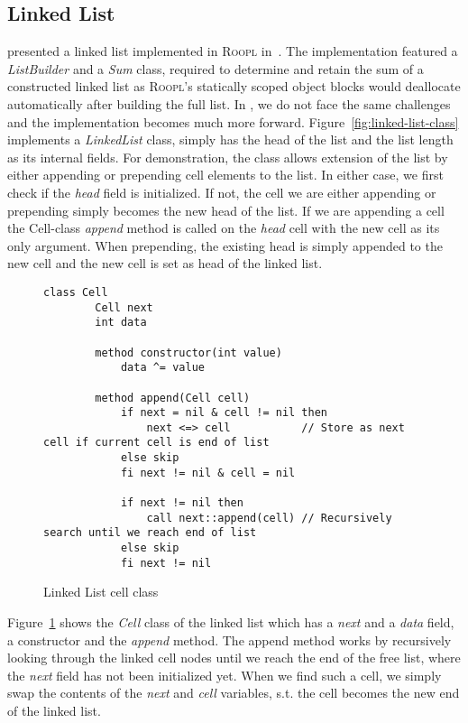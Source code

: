 \subsection{Linked List}
\label{subsec:linked-list}
\citeauthor{th:roopl} presented a linked list implemented in \textsc{Roopl} in~\cite{th:roopl}. The implementation featured a \textit{ListBuilder} and a \textit{Sum} class, required to determine and retain the sum of a constructed linked list as \textsc{Roopl}'s statically scoped object blocks would deallocate automatically after building the full list. In \rooplpp, we do not face the same challenges and the implementation becomes much more forward. Figure~\ref{fig:linked-list-class} implements a \textit{LinkedList} class, simply has the head of the list and the list length as its internal fields. For demonstration, the class allows extension of the list by either appending or prepending cell elements to the list. In either case, we first check if the \textit{head} field is initialized. If not, the cell we are either appending or prepending simply becomes the new head of the list. If we are appending a cell the Cell-class \textit{append} method is called on the \textit{head} cell with the new cell as its only argument. When prepending, the existing head is simply appended to the new cell and the new cell is set as head of the linked list.

\begin{figure}[ht!]
    \centering
    \begin{lstlisting}[style = basic, language = roopl] 
    class Cell
        Cell next
        int data
    
        method constructor(int value)
            data ^= value     
    
        method append(Cell cell)
            if next = nil & cell != nil then
                next <=> cell           // Store as next cell if current cell is end of list
            else skip
            fi next != nil & cell = nil
    
            if next != nil then
                call next::append(cell) // Recursively search until we reach end of list
            else skip
            fi next != nil
    \end{lstlisting}
    \caption{Linked List cell class}
    \label{fig:linked-list-cell-class}
\end{figure}

Figure~\ref{fig:linked-list-cell-class} shows the \textit{Cell} class of the linked list which has a \textit{next} and a \textit{data} field, a constructor and the \textit{append} method. The append method works by recursively looking through the linked cell nodes until we reach the end of the free list, where the \textit{next} field has not been initialized yet. When we find such a cell, we simply swap the contents of the \textit{next} and \textit{cell} variables, s.t. the cell becomes the new end of the linked list. 

